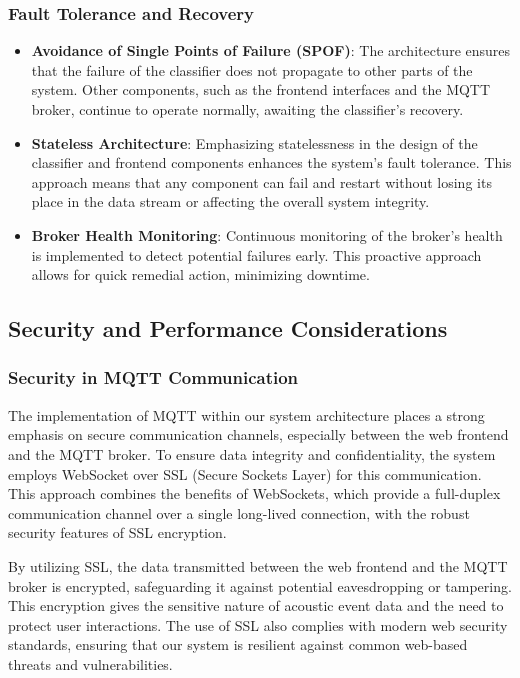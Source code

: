 \subsubsection{Fault Tolerance and Recovery}
\begin{itemize}
  \item \textbf{Avoidance of Single Points of Failure (SPOF)}: The architecture ensures that the failure of the classifier does not propagate to other parts of the system. Other components, such as the frontend interfaces and the MQTT broker, continue to operate normally, awaiting the classifier's recovery.
  \item \textbf{Stateless Architecture}: Emphasizing statelessness in the design of the classifier and frontend components enhances the system's fault tolerance. This approach means that any component can fail and restart without losing its place in the data stream or affecting the overall system integrity.
  \item \textbf{Broker Health Monitoring}: Continuous monitoring of the broker's health is implemented to detect potential failures early. This proactive approach allows for quick remedial action, minimizing downtime.
\end{itemize}

\subsection{Security and Performance Considerations}
\subsubsection{Security in MQTT Communication}
The implementation of MQTT within our system architecture places a strong emphasis on secure communication channels, especially between the web frontend and the MQTT broker. To ensure data integrity and confidentiality, the system employs WebSocket over SSL (Secure Sockets Layer) for this communication. This approach combines the benefits of WebSockets, which provide a full-duplex communication channel over a single long-lived connection, with the robust security features of SSL encryption.

By utilizing SSL, the data transmitted between the web frontend and the MQTT broker is encrypted, safeguarding it against potential eavesdropping or tampering. This encryption gives the sensitive nature of acoustic event data and the need to protect user interactions. The use of SSL also complies with modern web security standards, ensuring that our system is resilient against common web-based threats and vulnerabilities.

